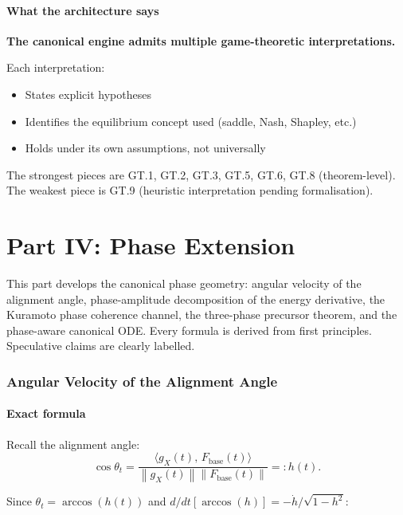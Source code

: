 \documentclass[11pt,a4paper]{article}
\theoremstyle{definition}
\newcommand{\norm}[1]{\left\|#1\right\|}
\newcommand{\inner}[2]{\langle #1,\,#2\rangle}
\newcommand{\Fbase}{F_{\mathrm{base}}}
\newcommand{\gX}{g_X}
\begin{document}
\subsection{What the architecture says}

\begin{lockedbox}
\centering\textbf{The canonical engine admits multiple game-theoretic interpretations.}
\end{lockedbox}

Each interpretation:
\begin{itemize}
\item States explicit hypotheses
\item Identifies the equilibrium concept used (saddle, Nash, Shapley, etc.)
\item Holds under its own assumptions, not universally
\end{itemize}

The strongest pieces are GT.1, GT.2, GT.3, GT.5, GT.6, GT.8 (theorem-level).
The weakest piece is GT.9 (heuristic interpretation pending formalisation).

\newpage
\part*{Part IV: Phase Extension}

This part develops the canonical phase geometry: angular velocity of the alignment angle,
phase-amplitude decomposition of the energy derivative, the Kuramoto phase coherence channel,
the three-phase precursor theorem, and the phase-aware canonical ODE.
Every formula is derived from first principles. Speculative claims are clearly labelled.

\section{Angular Velocity of the Alignment Angle}

\subsection{Exact formula}

Recall the alignment angle:
\[
\cos\theta_t = \frac{\inner{\gX(t)}{\Fbase(t)}}{\norm{\gX(t)}\norm{\Fbase(t)}} =: h(t).
\]

Since $\theta_t = \arccos(h(t))$ and $d/dt[\arccos(h)] = -\dot h/\sqrt{1-h^2}$:
\end{document}
